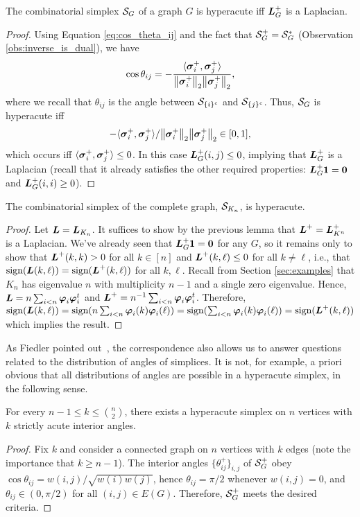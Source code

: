 \begin{lemma}
	The combinatorial simplex $\mathcal{S}_G$ of a graph $G$ is hyperacute iff $\vb*{L}_G^+$ is a Laplacian.
\end{lemma}
\begin{proof}
	Using Equation \ref{eq:cos_theta_ij} and the fact that $\mathcal{S}_G^+=\mathcal{S}_G^*$ (Observation \ref{obs:inverse_is_dual}), we have
	\[\cos \theta_{ij} = -\frac{\langle \vb*{\sigma}_i^+,\vb*{\sigma}_j^+\rangle }{\norm{\vb*{\sigma}_i^+}_2 \norm{\vb*{\sigma}_j^+}_2},\]
	where we recall that $\theta_{ij}$ is the angle between $\mathcal{S}_{\{i\}^c}$ and $\mathcal{S}_{\{j\}^c}$. Thus, $\mathcal{S}_G$ is hyperacute iff
	 \[-\langle \vb*{\sigma}_i^+,\vb*{\sigma}_j^+\rangle\\/\norm{\vb*{\sigma}_i^+}_2 \norm{\vb*{\sigma}_j^+}_2 \in[0,1],\] which occurs iff $\langle \vb*{\sigma}_i^+,\vb*{\sigma}_j^+\rangle \leq 0$. In this case $\vb*{L}_G^+(i,j)\leq 0$, implying that $\vb*{L}_G^+$ is a Laplacian (recall that it already satisfies the other required properties: $\vb*{L}_G^+\vb{1}=\vb{0}$ and $\vb*{L}_G^+(i,i)\geq 0$). 
\end{proof}

\begin{corollary}
	The combinatorial simplex of the complete graph,  $\mathcal{S}_{K_n}$, is hyperacute. 
\end{corollary}
\begin{proof}
	Let $\vb*{L}=\vb*{L}_{K_n}$. 
	It suffices to show by the previous lemma that $\vb*{L}^+=\vb*{L}_{K^n}^+$ is a Laplacian. We've already seen that $\vb*{L}_G^+\vb{1}=\vb{0}$ for any $G$, so it remains only to show that $\vb*{L}^+(k,k)>0$ for all $k\in[n]$ and $\vb*{L}^+(k,\ell)\leq 0$ for all $k\neq\ell$, i.e., that $\textnormal{sign}(\vb*{L}(k,\ell))=\textnormal{sign}(\vb*{L}^+(k,\ell))$ for all $k,\ell$. Recall from Section \ref{sec:examples} that $K_n$ has eigenvalue $n$ with multiplicity $n-1$ and a single zero eigenvalue. Hence, $\vb*{L}=n\sum_{i<n}\vb*{\varphi}_i\vb*{\varphi}_i^t$ and $\vb*{L}^+=n^{-1}\sum_{i<n}\vb*{\varphi}_i\vb*{\varphi}_i^t$. 
	Therefore, $\textnormal{sign}(\vb*{L}(k,\ell)) = \textnormal{sign}(n\sum_{i<n}\vb*{\varphi}_i(k)\vb*{\varphi}_i(\ell)) = \textnormal{sign}(\sum_{i<n}\vb*{\varphi}_i(k)\vb*{\varphi}_i(\ell)) = \textnormal{sign}(\vb*{L}^+(k,\ell))$ which implies the result. 
\end{proof}


As Fiedler pointed out~\cite{fiedler1993geometric}, the correspondence also allows us to answer questions related to the distribution of angles of simplices. It is not, for example, a priori obvious that all distributions of angles  are possible in a hyperacute simplex, in the following sense. 

\begin{lemma}
	For every $n-1\leq k \leq {n\choose 2}$, there exists a hyperacute simplex on $n$ vertices with $k$ strictly acute interior angles. 
\end{lemma}
\begin{proof}
	Fix $k$ and consider a connected graph on $n$ vertices with $k$ edges (note the importance that $k\geq n-1$). The interior angles $\{\theta_{ij}^+\}_{i,j}$ of $\mathcal{S}_G^+$ obey $\cos\theta_{ij} = w(i,j) / \sqrt{w(i)w(j)}$, hence $\theta_{ij}=\pi/2$ whenever $w(i,j)=0$, and $\theta_{ij}\in(0,\pi/2)$ for all $(i,j)\in E(G)$. Therefore, $\mathcal{S}_G^+$ meets the desired criteria. 
\end{proof}



